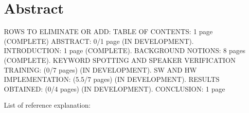 \chapter*{Abstract} %
\label{abtract}

ROWS TO ELIMINATE OR ADD:\newline\newline
TABLE OF CONTENTS: 1 page (COMPLETE)\newline
ABSTRACT: 0/1 page (IN DEVELOPMENT). INTRODUCTION: 1 page (COMPLETE). BACKGROUND NOTIONS: 8 pages (COMPLETE). KEYWORD SPOTTING AND SPEAKER VERIFICATION TRAINING: (0/7 pages) (IN DEVELOPMENT). SW AND HW IMPLEMENTATION: (5.5/7 pages) (IN DEVELOPMENT). RESULTS OBTAINED: (0/4 pages) (IN DEVELOPMENT). CONCLUSION: 1 page\newline
{} %
List of reference explanation:\newline

